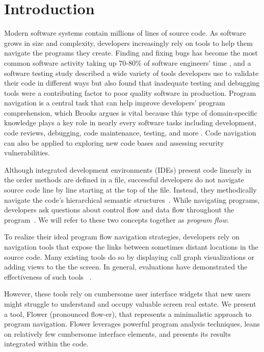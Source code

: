 \documentclass[conference]{IEEEtran}
\begin{document}



\IEEEpeerreviewmaketitle


\section{Introduction}
Modern software systems contain millions of lines of source code. 
As software grows in size and complexity, developers increasingly rely on tools to help them navigate the programs they create. Finding and fixing bugs has become the most common software activity taking up 70-80\% of software engineers' time \cite{Whyline}, and a software testing study described a wide variety of tools developers use to validate their code in different ways but also found that inadequate testing and debugging tools were a contributing factor to poor quality software in production\cite{NIST-02-3}.
Program navigation is a central task that can help improve developers' program comprehension, which Brooks argues is vital because this type of domain-specific knowledge plays a key role in nearly every software tasks including development, code reviews, debugging, code maintenance, testing, and more \cite{BrooksComprehension}. Code navigation can also be applied to exploring new code bases and assessing security vulnerabilities. 

Although integrated development environments (IDEs) present code linearly in the order methods are defined in a file, successful developers do not navigate source code line by line starting at the top of the file. 
Instead, they methodically navigate the code's hierarchical semantic structures~\cite{robillard2004investigate}.
While navigating programs, developers ask questions about control flow and data flow throughout the program~\cite{latoza2010hard, Smith2015}. 
We will refer to these two concepts together as \textit{program flow}. 

To realize their ideal program flow navigation strategies, developers rely on navigation tools that expose the links between sometimes distant locations in the source code. 
Many existing tools do so by displaying call graph visualizations or adding views to the the screen.
In general, evaluations have demonstrated the effectiveness of such tools ~\cite{Reacher,Whyline,Relo,Stacksplorer}.

However, these tools rely on cumbersome user interface widgets that new users might struggle to understand and occupy valuable screen real estate.
We present a tool, Flower (pronounced flow-er), that represents a minimalistic approach to program navigation.
Flower  leverages powerful program analysis techniques, leans on relatively few cumbersome interface elements, and presents its results integrated within the code.
\end{document}
